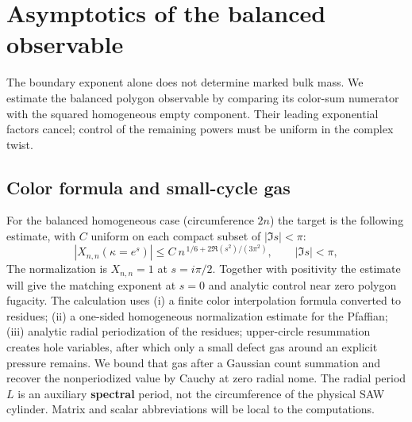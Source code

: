 \section{Asymptotics of the balanced observable}\label{c01-c1-asymptotics-of-the-balanced-observable}

The boundary exponent alone does not determine marked bulk mass. We estimate the balanced polygon observable by comparing its color-sum numerator with the squared homogeneous empty component. Their leading exponential factors cancel; control of the remaining powers must be uniform in the complex twist.

\subsection{Color formula and small-cycle gas}\label{c01-c1-color-formula-and-small-cycle-gas}

For the balanced homogeneous case (circumference \(2n\)) the target is the following estimate, with \(C\) uniform on each compact subset of \(|\Im s|<\pi\):
\[
 |X_{n,n}(\kappa=e^s)|\le C\ n^{\,1/6+2\Re(s^2)/(3\pi^2)},\qquad |\Im s|<\pi ,
\]
The normalization is \(X_{n,n}=1\) at \(s=i\pi/2\). Together with positivity the estimate will give the matching exponent at \(s=0\) and analytic control near zero polygon fugacity. The calculation uses (i) a finite color interpolation formula converted to residues; (ii) a one-sided homogeneous normalization estimate for the Pfaffian; (iii) analytic radial periodization of the residues; upper-circle resummation creates hole variables, after which only a small defect gas around an explicit pressure remains. We bound that gas after a Gaussian count summation and recover the nonperiodized value by Cauchy at zero radial nome. The radial period \(L\) is an auxiliary \textbf{spectral} period, not the circumference of the physical SAW cylinder. Matrix and scalar abbreviations will be local to the computations.

